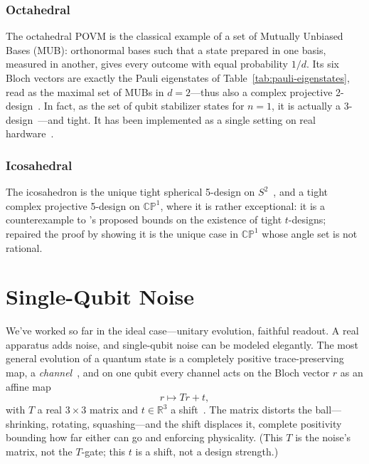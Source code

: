 \documentclass[11pt, oneside, openany]{scrbook}
\newcommand{\R}{\mathbb{R}}
\begin{document}
\subsubsection{Octahedral}

The octahedral POVM is the classical example of a set of Mutually Unbiased Bases (MUB): orthonormal bases such that a state prepared in one basis, measured in another, gives every outcome with equal probability $1/d$. Its six Bloch vectors are exactly the Pauli eigenstates of Table~\ref{tab:pauli-eigenstates}, read as the maximal set of MUBs in $d = 2$---thus also a complex projective 2-design~\cite{klappenecker2005mutuallyunbiasedbases}. In fact, as the set of qubit stabilizer states for $n = 1$, it is actually a 3-design~\cite{kueng2015qubitstabilizerstates}---and tight. It has been implemented as a single setting on real hardware~\cite{an2024efficientcharacterizationsmultiphoton}.

\subsubsection{Icosahedral}

The icosahedron is the unique tight spherical 5-design on $S^2$~\cite[Example~5.16]{delsarte1977sphericalcodesdesigns}, and a tight complex projective 5-design on $\mathbb{CP}^1$, where it is rather exceptional: it is a counterexample to \textcite{hoggar1989tight45designs}'s proposed bounds on the existence of tight $t$-designs; \textcite{lyubich2007tightprojectivedesigns} repaired the proof by showing it is the unique case in $\mathbb{CP}^1$ whose angle set is not rational.

\section{Single-Qubit Noise} \label{sec:single-qubit-noise}

We've worked so far in the ideal case---unitary evolution, faithful readout. A real apparatus adds noise, and single-qubit noise can be modeled elegantly. The most general evolution of a quantum state is a completely positive trace-preserving map, a \textit{channel}~\cite[Ch.~8]{nielsen2010quantumcomputationquantum}, and on one qubit every channel acts on the Bloch vector $r$ as an affine map
$$ r \mapsto Tr + t, $$
with $T$ a real $3 \times 3$ matrix and $t \in \R^3$ a shift~\cite[App.~A.2]{acharya2021informationallycompletepovmbased}. The matrix distorts the ball---shrinking, rotating, squashing---and the shift displaces it, complete positivity bounding how far either can go and enforcing physicality. (This $T$ is the noise's matrix, not the $T$-gate; this $t$ is a shift, not a design strength.)
\end{document}

